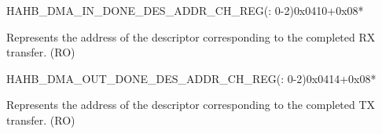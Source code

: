 \begin{register}{H}{AHB\_DMA\_IN\_DONE\_DES\_ADDR\_CH\_REG(: 0-2)}{0x0410+0x08*}\label{regdesc:AHBDMAINDONEDESADDRCHNREG}
%
\regnewline%
\begin{regdesc}\begin{reglist}
\label{fielddesc:AHBDMAINDONEDESADDRCHNREG}\item [AHB\_DMA\_IN\_DONE\_DES\_ADDR\_CH\regindex{n}] Represents the address of the descriptor corresponding to the completed RX transfer. (RO)
\end{reglist}\end{regdesc}
\end{register}


\begin{register}{H}{AHB\_DMA\_OUT\_DONE\_DES\_ADDR\_CH\_REG(: 0-2)}{0x0414+0x08*}\label{regdesc:AHBDMAOUTDONEDESADDRCHNREG}
%
\regnewline%
\begin{regdesc}\begin{reglist}
\label{fielddesc:AHBDMAOUTDONEDESADDRCHNREG}\item [AHB\_DMA\_OUT\_DONE\_DES\_ADDR\_CH\regindex{n}] Represents the address of the descriptor corresponding to the completed TX transfer. (RO)
\end{reglist}\end{regdesc}
\end{register}
